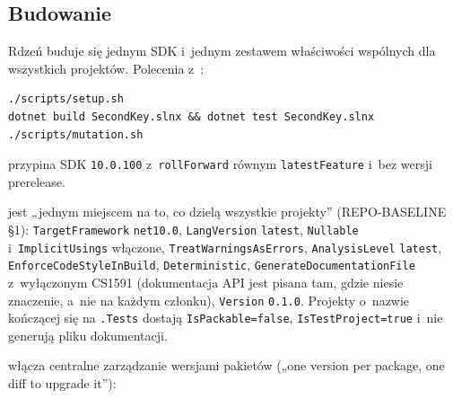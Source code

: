 
\subsection{Budowanie}\label{sec:rdzen-build}

Rdzeń buduje się jednym SDK i~jednym zestawem właściwości wspólnych dla wszystkich
projektów. Polecenia z~:

\begin{lstlisting}
./scripts/setup.sh
dotnet build SecondKey.slnx && dotnet test SecondKey.slnx
./scripts/mutation.sh
\end{lstlisting}

 przypina SDK \texttt{10.0.100} z~\texttt{rollForward} równym
\texttt{latestFeature} i~bez wersji prerelease.

 jest „jednym miejscem na to, co dzielą wszystkie projekty”
(REPO-BASELINE §1): \texttt{TargetFramework} \texttt{net10.0}, \texttt{LangVersion}
\texttt{latest}, \texttt{Nullable} i~\texttt{ImplicitUsings} włączone,
\texttt{TreatWarningsAsErrors}, \texttt{AnalysisLevel} \texttt{latest},
\texttt{EnforceCodeStyleInBuild}, \texttt{Deterministic}, \texttt{GenerateDocumentationFile}
z~wyłączonym CS1591 (dokumentacja API jest pisana tam, gdzie niesie znaczenie, a~nie na
każdym członku), \texttt{Version} \texttt{0.1.0}. Projekty o~nazwie kończącej się na
\texttt{.Tests} dostają \texttt{IsPackable=false}, \texttt{IsTestProject=true} i~nie
generują pliku dokumentacji.

 włącza centralne zarządzanie wersjami pakietów („one version
per package, one diff to upgrade it”):

